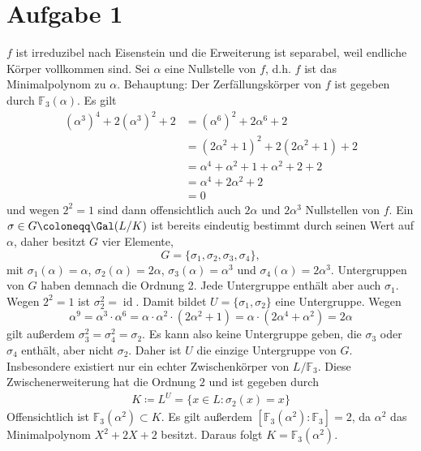 \documentclass{article}
\newcommand{\id}{\operatorname{id}}
\begin{document}
\def\headheight{25pt}
    \section*{Aufgabe 1}
    $f$ ist irreduzibel nach Eisenstein und die Erweiterung ist separabel, weil endliche Körper vollkommen sind.
    Sei $\alpha$ eine Nullstelle von $f$, d.h. $f$ ist das Minimalpolynom zu $\alpha$.
    Behauptung: Der Zerfällungskörper von $f$ ist gegeben durch $\mathbb{F}_3(\alpha)$.
    Es gilt 
    \begin{align*}    
        (\alpha^3)^4 + 2(\alpha^3)^2 + 2 &= (\alpha^6)^2 + 2\alpha^6 + 2\\
        &= (2\alpha^2 + 1)^2 + 2(2\alpha^2 + 1) + 2\\
        &= \alpha^4 + \alpha^2 + 1 + \alpha^2 + 2 + 2\\
        &= \alpha^4 + 2\alpha^2 +2\\
        &= 0
    \end{align*}
    und wegen $2^2 = 1$ sind dann offensichtlich auch $2\alpha$ und $2\alpha^3$ Nullstellen von $f$.
    Ein $\sigma \in G\coloneqq \Gal(L/K)$ ist bereits eindeutig bestimmt durch seinen Wert auf $\alpha$, daher besitzt $G$ vier Elemente, 
    \[
        G = \{\sigma_1, \sigma_2, \sigma_3, \sigma_4\},
    \]
    mit $\sigma_1(\alpha) = \alpha$, $\sigma_2(\alpha) = 2\alpha$, $\sigma_3(\alpha) = \alpha^3$ und $\sigma_4(\alpha) = 2\alpha^3$.
    Untergruppen von $G$ haben demnach die Ordnung 2. Jede Untergruppe enthält aber auch $\sigma_1$. Wegen $2^2 = 1$ ist $\sigma_2^2 = \id$. Damit bildet $U = \{\sigma_1, \sigma_2\}$ eine Untergruppe.
    Wegen
    \[ 
        \alpha^9 = \alpha^3 \cdot \alpha^6 = \alpha \cdot \alpha^2 \cdot (2\alpha^2 +1) = \alpha \cdot (2\alpha^4 + \alpha^2) = 2\alpha
    \]
    gilt außerdem $\sigma_3^2 = \sigma_4^2 = \sigma_2$.
    Es kann also keine Untergruppe geben, die $\sigma_3$ oder $\sigma_4$ enthält, aber nicht $\sigma_2$. Daher ist $U$ die einzige Untergruppe von $G$.
    Insbesondere existiert nur ein echter Zwischenkörper von $L/\mathbb{F}_3$. Diese Zwischenerweiterung hat die Ordnung $2$ und ist gegeben durch 
    \begin{align*}
        K \coloneqq L^U = \{x \in L: \sigma_2(x) = x\}
    \end{align*}
    Offensichtlich ist $\mathbb{F}_3(\alpha^2) \subset K$. Es gilt außerdem $[\mathbb{F}_3(\alpha^2) : \mathbb{F}_3] = 2$, da $\alpha^2$ das Minimalpolynom $X^2 + 2X + 2$ besitzt. Daraus folgt $K = \mathbb{F}_3(\alpha^2)$.
\end{document}
